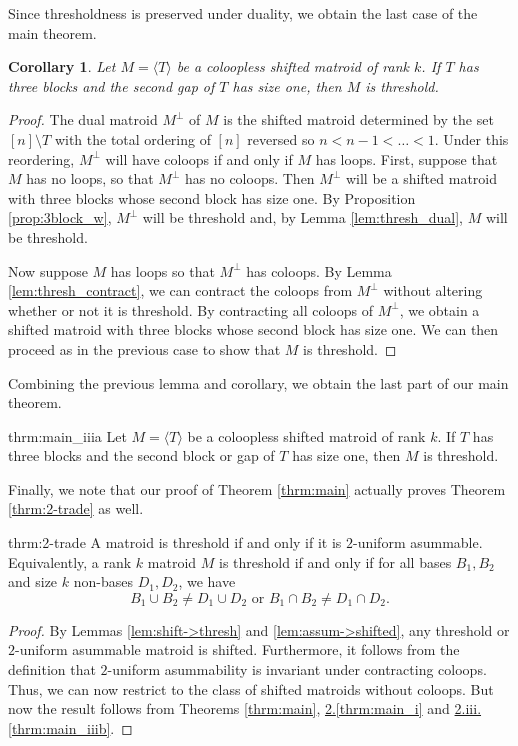 \documentclass[10pt,a4paper]{amsart}
\theoremstyle{definition}
\theoremstyle{plain}
\newtheorem{corollary}[defn]{Corollary}
\begin{document}
Since thresholdness is preserved under duality, we obtain the last case of the main theorem. 

\begin{corollary}
Let $M=\langle T\rangle$ be a coloopless shifted matroid of rank $k$. If $T$ has three blocks and the second gap of $T$ has size one, then $M$ is threshold.
\end{corollary}
\begin{proof}
The dual matroid $M^\perp$ of $M$ is the shifted matroid determined by the set $[n]\setminus T$ with the total ordering of $[n]$ reversed so $n<n-1<\ldots < 1$. Under this reordering, $M^\perp$ will have coloops if and only if $M$ has loops. First, suppose that $M$ has no loops, so that $M^\perp$ has no coloops. Then $M^\perp$ will be a shifted matroid with three blocks whose second block has size one. By Proposition \ref{prop:3block_w}, $M^\perp$ will be threshold and, by Lemma \ref{lem:thresh_dual}, $M$ will be threshold. 

Now suppose $M$ has loops so that $M^\perp$ has coloops. By Lemma \ref{lem:thresh_contract}, we can contract the coloops from $M^\perp$ without altering whether or not it is threshold. By contracting all coloops of $M^\perp$, we obtain a shifted matroid with three blocks whose second block has size one. We can then proceed as in the previous case to show that $M$ is threshold.
\end{proof}

Combining the previous lemma and corollary, we obtain the last part of our main theorem.
\begin{repdoubletheorem}{thrm:main_iiia}
Let $M=\langle T\rangle$ be a coloopless shifted matroid of rank $k$. If $T$ has three blocks and the second block or gap of $T$ has size one, then $M$ is threshold.
\end{repdoubletheorem}

Finally, we note that our proof of Theorem \ref{thrm:main} actually proves Theorem \ref{thrm:2-trade} as well.

\begin{repintrotheorem}{thrm:2-trade}
A matroid is threshold if and only if it is $2$-uniform asummable. Equivalently, a rank $k$ matroid $M$ is threshold if and only if for all bases $B_1,B_2$ and size $k$ non-bases $D_1,D_2$, we have 
\[B_1 \cup B_2 \neq D_1 \cup D_2 \text{ or } B_1\cap B_2 \neq D_1 \cap D_2. \]
\end{repintrotheorem}
\begin{proof}
  By Lemmas \ref{lem:shift->thresh} and \ref{lem:assum->shifted}, any threshold or $2$-uniform asummable matroid is shifted. Furthermore, it follows from the definition that $2$-uniform asummability is invariant under contracting coloops. Thus, we can now restrict to the class of shifted matroids without coloops. But now the result follows from Theorems \ref{thrm:main}, \hyperref[thrm:main_i]{2.\ref*{thrm:main_i}} and \hyperref[thrm:main_iiib]{2.iii.\ref*{thrm:main_iiib}}.
\end{proof}
\end{document}
